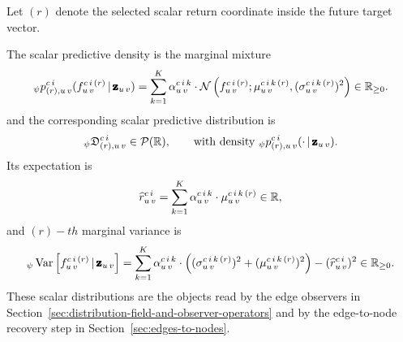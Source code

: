 Let $(r)$ denote the selected scalar return coordinate
inside the future target vector.

The scalar predictive density is the marginal mixture
\[
  {}_{\psi}p_{(r),u\,v}^{c\,i}(f_{u\,v}^{c\,i\,(r)}\,\vert\,\pmb{\mathbf{z}}_{u\,v})
  =
  \sum_{k=1}^{K}
  \alpha_{u\,v}^{c\,i\,k}\cdot
  \mathcal{N}
  \left(
    f_{u\,v}^{c\,i\,(r)};
    \mu_{u\,v}^{c\,i\,k\,(r)},
    (\sigma_{u\,v}^{c\,i\,k\,(r)})^{2}
  \right)
  \in\mathbb{R}_{\ge 0}.
\]
and the corresponding scalar predictive distribution is
\[
  {}_{\psi}\mathfrak{D}_{(r),u\,v}^{c\,i}
  \in\mathcal{P}(\mathbb{R}),
  \qquad
  \text{with density }
  {}_{\psi}p_{(r),u\,v}^{c\,i}(\cdot\,\vert\,\pmb{\mathbf{z}}_{u\,v}).
\]
Its expectation is
\[
  \widehat{r}_{u\,v}^{c\,i}
  =
  \sum_{k=1}^{K}
  \alpha_{u\,v}^{c\,i\,k}\cdot
  \mu_{u\,v}^{c\,i\,k\,(r)}
  \in\mathbb{R},
\]
and $(r)-th$ marginal variance is
\[
  {}_{\psi}\operatorname{Var}
  \left[
    f_{u\,v}^{c\,i\,(r)}
    \,\vert\,
    \pmb{\mathbf{z}}_{u\,v}
  \right]
  =
  \sum_{k=1}^{K}
  \alpha_{u\,v}^{c\,i\,k}\cdot
  \left(
    (\sigma_{u\,v}^{c\,i\,k\,(r)})^{2}
    +
    (\mu_{u\,v}^{c\,i\,k\,(r)})^{2}
  \right)
  -
  (\widehat{r}_{u\,v}^{c\,i})^{2}
  \in\mathbb{R}_{\ge 0}.
\]
These scalar distributions are the objects read by the edge observers in
Section~\ref{sec:distribution-field-and-observer-operators} and by the
edge-to-node recovery step in Section~\ref{sec:edges-to-nodes}.
